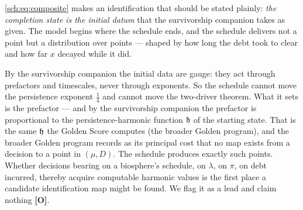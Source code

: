 \begin{remark}
\label{sch:rem:initialdata}
\eqref{sch:eq:composite} makes an identification that should be stated plainly:
\emph{the completion state is the initial datum} that
the survivorship companion \cite{GoldenSurvivorship} takes as given. The model begins where the
schedule ends, and the schedule delivers not a point but a distribution
over points --- shaped by how long the debt took to clear and how far
$x$ decayed while it did.

By the survivorship companion \cite{GoldenSurvivorship} the initial data are gauge: they act
through prefactors and timescales, never through exponents. So the
schedule cannot move the persistence exponent $\tfrac14$ and cannot move
the two-driver theorem. What it sets
is the prefactor --- and by the survivorship companion \cite{GoldenSurvivorship} the prefactor
is proportional to the persistence-harmonic function $\mathfrak{h}$ of the
starting state. That is the same $\mathfrak{h}$ the Golden Score computes
(the broader Golden program), and the broader Golden program records as
its principal cost that no map exists from a decision to a point in
$(\mu,D)$. The schedule produces exactly such points. Whether decisions
bearing on a biosphere's schedule, on $\lambda$, on $\pi$, on debt
incurred, thereby acquire computable harmonic values is the first
place a candidate identification map might be found. We flag it as a
lead and claim nothing \textbf{[O]}.
\end{remark}

